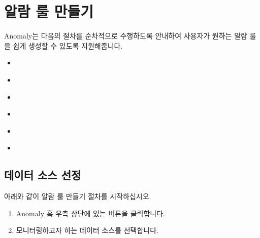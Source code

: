 \documentclass[letterpaper,10pt,english]{sphinxmanual}
\begin{document}
\chapter{알람 룰 만들기}
\label{\detokenize{part02/index:id1}}\label{\detokenize{part02/index::doc}}
Anomaly는 다음의 절차를 순차적으로 수행하도록 안내하여 사용자가 원하는 알람 룰을 쉽게 생성할 수 있도록 지원해줍니다.
\begin{itemize}
\item {} 
{\hyperref[\detokenize{part02/index:select-datasource}]{}}

\item {} 
{\hyperref[\detokenize{part02/index:select-columns}]{}}

\item {} 
{\hyperref[\detokenize{part02/index:configure-training}]{}}

\item {} 
{\hyperref[\detokenize{part02/index:select-model}]{}}

\item {} 
{\hyperref[\detokenize{part02/index:alarm-rule-settings}]{}}

\item {} 
{\hyperref[\detokenize{part02/index:complete-rule}]{}}

\end{itemize}


\section{데이터 소스 선정}
\label{\detokenize{part02/index:select-datasource}}\label{\detokenize{part02/index:id2}}
아래와 같이 알람 룰 만들기 절차를 시작하십시오.
\begin{enumerate}
%
\item {} 
Anomaly 홈 우측 상단에 있는  버튼을 클릭합니다.
\begin{quote}

\begin{figure}[H]
\centering

\noindent{}
\end{figure}
\end{quote}

\item {} 
모니터링하고자 하는 데이터 소스를 선택합니다.
\begin{quote}

\begin{figure}[H]
\centering

\noindent{}
\end{figure}
\end{quote}

\end{enumerate}
\end{document}
